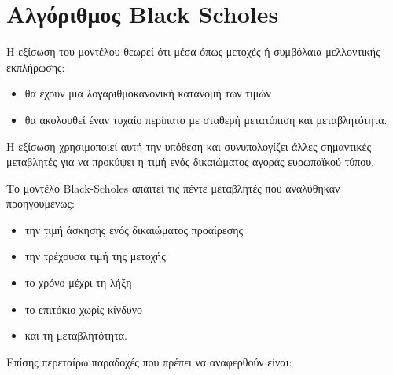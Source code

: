 \section{Αλγόριθμος Black Scholes}

H εξίσωση του μοντέλου θεωρεί ότι μέσα όπως μετοχές ή συμβόλαια μελλοντικής εκπλήρωσης:
\begin{itemize}
    \item θα έχουν μια λογαριθμοκανονική κατανομή των τιμών
    \item θα ακολουθεί έναν τυχαίο περίπατο με σταθερή μετατόπιση και μεταβλητότητα.
\end{itemize}

Η εξίσωση χρησιμοποιεί αυτή την υπόθεση και συνυπολογίζει άλλες σημαντικές μεταβλητές για να προκύψει η τιμή ενός δικαιώματος αγοράς ευρωπαϊκού τύπου.

Το μοντέλο Black-Scholes απαιτεί τις πέντε μεταβλητές που αναλύθηκαν προηγουμένως:
\begin{itemize}
    \item την τιμή άσκησης ενός δικαιώματος προαίρεσης
    \item την τρέχουσα τιμή της μετοχής
    \item το χρόνο μέχρι τη λήξη
    \item το επιτόκιο χωρίς κίνδυνο
    \item και τη μεταβλητότητα.
\end{itemize}

Επίσης περεταίρω παραδοχές που πρέπει να αναφερθούν είναι:

